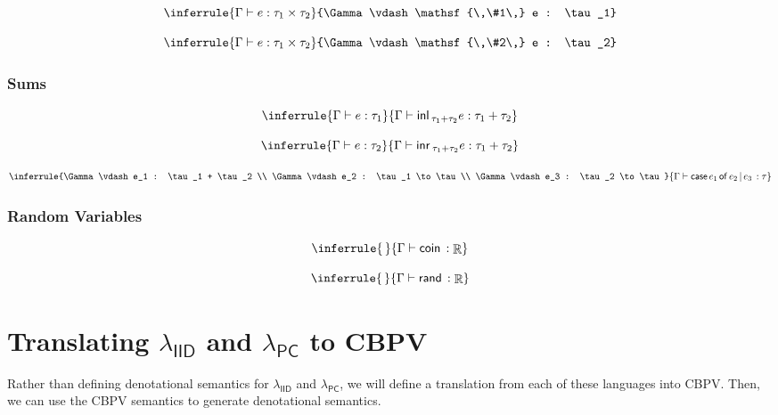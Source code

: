 \documentclass{article}
\DeclareMathOperator*\R{\mathbb{R}}
\newcommand{\iid}{\mathsf{IID}}
\newcommand{\pc}{\mathsf{PC}}
\newcommand{\rand}{\mathsf{rand\,}}
\newcommand{\coin}{\mathsf{coin\,}}
\newcommand{\inl}{\mathsf{inl\,}}
\newcommand{\inr}{\mathsf{inr\,}}
\newcommand{\case}[3]{\mathsf{case} \, #1 \, \mathsf{of} \, #2 \, | \, #3 \,}
\newcommand{\1}{\mathsf{\,\#1\,}}
\newcommand{\2}{\mathsf{\,\#2\,}}
\begin{document}
\begin{multicols}{2}
\begin{equation*}
	\inferrule{\Gamma \vdash e : \tau_1 \times \tau_2 }
	{\Gamma \vdash \1 e : \tau_1}
\end{equation*}

\begin{equation*}
	\inferrule{\Gamma \vdash e : \tau_1 \times \tau_2 }
	{\Gamma \vdash \2 e : \tau_2}
\end{equation*}

\subsubsection*{Sums}
\begin{equation*}
	\inferrule{\Gamma \vdash e : \tau_1}
	{\Gamma \vdash \inl_{\tau_1 + \tau_2} e : \tau_1 + \tau_2}
\end{equation*}

\begin{equation*}
	\inferrule{\Gamma \vdash e : \tau_2}
	{\Gamma \vdash \inr_{\tau_1 + \tau_2} e : \tau_1 + \tau_2}
\end{equation*}

\begin{equation*}
	\inferrule{\Gamma \vdash e_1 : \tau_1 + \tau_2 \\ 
	\Gamma \vdash e_2 : \tau_1 \to \tau \\
	\Gamma \vdash e_3 : \tau_2 \to \tau }
	{\Gamma \vdash \case{e_1}{e_2}{e_3} : \tau}
\end{equation*}

\subsubsection*{Random Variables}
\begin{equation*}
	\inferrule{\,}
	{\Gamma \vdash \coin : \R}
\end{equation*}

\begin{equation*}
	\inferrule{\,}
	{\Gamma \vdash \rand : \R}
\end{equation*}
\end{multicols}

\newpage
\section{Translating $\lambda_{\iid}$ and $\lambda_{\pc}$ to CBPV}
Rather than defining denotational semantics for $\lambda_{\iid}$ and $\lambda_{\pc}$,
we will define a translation from each of these languages into CBPV.
Then, we can use the CBPV semantics to generate denotational semantics.
\end{document}
